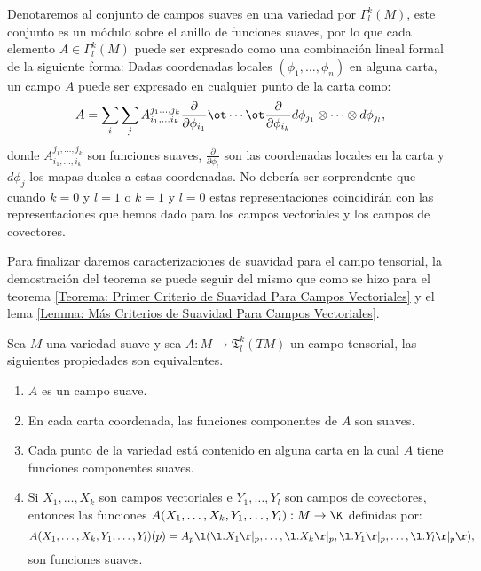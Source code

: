 Denotaremos al conjunto de campos suaves en una variedad por
$\Gamma^{k}_{l}(M)$, este conjunto es un módulo sobre el anillo de funciones
suaves, por lo que cada elemento $A \in \Gamma^{k}_{l}(M)$ puede ser expresado
como una combinación lineal formal de la siguiente forma: Dadas coordenadas
locales $(\phi_1, \ldots, \phi_n)$ en alguna carta, un campo $A$ puede ser
expresado en cualquier punto de la carta como:
\[
	A = \sum_{i}\sum_{j}
	A_{i_1, \ldots i_k}^{j_1 \ldots, j_k}
	\frac{\partial}{\partial \phi_{i_1}} \ot
	\cdots \ot \frac{\partial}{\partial \phi_{i_k}}
	d\phi_{j_1} \otimes \cdots \otimes d\phi_{j_l},
\]
donde $A_{i_1,\ldots,i_k}^{j_1,\ldots,j_k}$ son funciones suaves,
$\frac{\partial}{\partial \phi_i}$ son las coordenadas locales en la carta y
$d\phi_{j}$ los mapas duales a estas coordenadas. No debería ser sorprendente
que cuando $k=0$ y $l=1$ o $k=1$ y $l=0$ estas representaciones coincidirán con las
representaciones que hemos dado para los campos vectoriales y los campos de
covectores.

Para finalizar daremos caracterizaciones de suavidad para el campo tensorial, la
demostración del teorema se puede seguir del mismo que como se hizo para el
teorema \ref{Teorema: Primer Criterio de Suavidad Para Campos Vectoriales} y el
lema \ref{Lemma: Más Criterios de Suavidad Para Campos Vectoriales}.

\begin{theorem}
	\label{Teorema: Criterios de suavidad para campos tensoriales}
	Sea $M$ una variedad suave y sea $A: M \to \mathfrak{T}^{k}_{l}(TM)$
	un campo tensorial, las siguientes propiedades son equivalentes.
	\begin{enumerate}
		\item $A$ es un campo suave.
		\item En cada carta coordenada, las funciones componentes de $A$ son
		      suaves.
		\item Cada punto de la variedad está contenido en alguna carta en la cual
		      $A$ tiene funciones componentes suaves.
		\item Si $X_1, \ldots, X_k$ son campos vectoriales e $Y_1, \ldots, Y_l$ son
		      campos de covectores, entonces las funciones $A(X_1, \ldots, X_k,
			      Y_1,\ldots,Y_l):
			      M \to \K$ definidas por:
		      \[
			      A(X_1,\ldots,X_k,Y_1,\ldots,Y_l)(p)
			      =
			      A_p
			      \l(
			      \l. X_1 \r|_{p},
			      \ldots,
			      \l. X_k \r|_{p},
			      \l. Y_{1} \r|_{p},
			      \ldots,
			      \l. Y_{l} \r|_{p}
			      \r),
		      \]
		      son funciones suaves.
	\end{enumerate}
\end{theorem}
